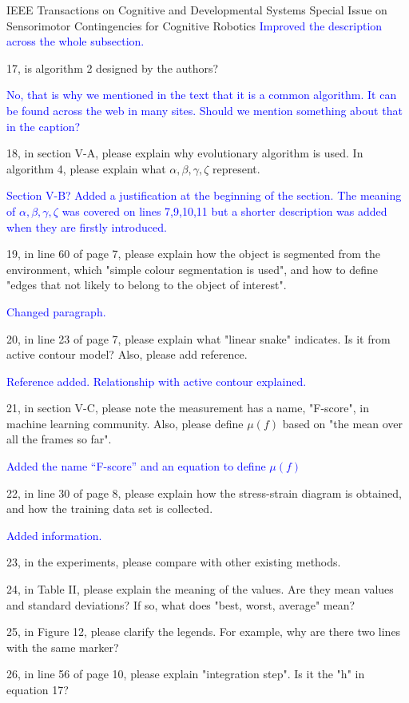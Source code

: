 \documentclass[a4paper,12pt]{letter}
\newcommand{\comment}[1]{\textcolor{blue}{#1}}
\begin{document}
\begin{letter}{IEEE Transactions on Cognitive and Developmental Systems\newline
Special Issue on Sensorimotor Contingencies for Cognitive Robotics}
\comment{Improved the description across the whole subsection.}

17, is algorithm 2 designed by the authors?

\comment{No, that is why we mentioned in the text that it is a common algorithm.  It can be found across the web in many sites.  Should we mention something about that in the caption?}

18, in section V-A, please explain why evolutionary algorithm is used. In algorithm 4, please explain what $\alpha, \beta, \gamma, \zeta$ represent.

\comment{Section V-B? Added a justification at the beginning of the section.  The meaning of $\alpha, \beta, \gamma, \zeta$ was covered on lines 7,9,10,11 but a shorter description was added when they are firstly introduced.}

19, in line 60 of page 7, please explain how the object is segmented from the environment, which "simple colour segmentation is used", and how to define "edges that not likely to belong to the object of interest".

\comment{Changed paragraph.}

20, in line 23 of page 7, please explain what "linear snake" indicates. Is it from active contour model? Also, please add reference. 

\comment{Reference added.  Relationship with active contour explained.}

21, in section V-C, please note the measurement has a name, "F-score", in machine learning community. Also, please define $\mu(f)$ based on "the mean over all the frames so far".

\comment{Added the name ``F-score'' and an equation to define $\mu(f)$}

22, in line 30 of page 8, please explain how the stress-strain diagram is obtained, and how the training data set is collected. 

\comment{Added information.}

23, in the experiments, please compare with other existing methods. 

24, in Table II, please explain the meaning of the values. Are they mean values and standard deviations? If so, what does "best, worst, average" mean? 

25, in Figure 12, please clarify the legends. For example, why are there two lines with the same marker? 

26, in line 56 of page 10, please explain "integration step". Is it the "h" in equation 17? 


\end{letter}
\end{document}
